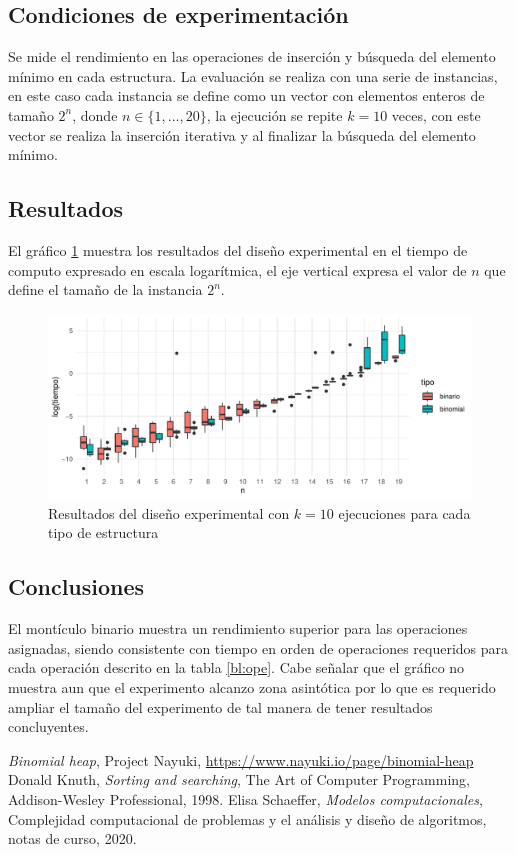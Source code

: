 \documentclass[letterpaper,11pt]{article}
\begin{document}
\subsection{Condiciones de experimentación}
Se mide el rendimiento en las operaciones de inserción y búsqueda del elemento mínimo en cada estructura. La evaluación se realiza con una serie de instancias, en este caso cada instancia se define como un vector con elementos enteros de tamaño ${2^n}$, donde $n\in \{1,\dots,20\}$, la ejecución se repite $k=10$ veces, con este vector se realiza la inserción iterativa y al finalizar la búsqueda del elemento mínimo.

\subsection{Resultados}
El gráfico \ref{fig:bs} muestra los resultados del diseño experimental en el tiempo de computo expresado en escala logarítmica, el eje vertical expresa el valor de $n$ que define el tamaño de la instancia ${2^n}$. 

\begin{figure}[h]
 \centering
  \includegraphics[width=11.5cm]{img/A9_boxplot.pdf}
  \caption{Resultados del diseño experimental con $k=10$ ejecuciones para cada tipo de estructura}
  \label{fig:bs}
\end{figure}

\subsection{Conclusiones}

El montículo binario muestra un rendimiento superior para las operaciones asignadas, siendo consistente con tiempo en orden de operaciones requeridos para cada operación descrito en la tabla \ref{bl:ope}. Cabe señalar que el gráfico no muestra aun que el experimento alcanzo zona asintótica por lo que es requerido ampliar el tamaño del experimento de tal manera de tener resultados concluyentes.




\begin{thebibliography}{0}
   \textit{Binomial heap},  Project Nayuki, \url{https://www.nayuki.io/page/binomial-heap} 
   Donald Knuth, \textit{Sorting and searching}, The Art of Computer Programming, Addison-Wesley Professional, 1998.
   Elisa Schaeffer, \textit{Modelos computacionales}, Complejidad computacional de problemas y el análisis y diseño de algoritmos, notas de curso, 2020.
\end{thebibliography}
\end{document}
